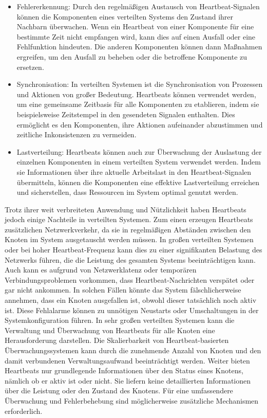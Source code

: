 \begin{itemize}
\item Fehlererkennung: Durch den regelmäßigen Austausch von Heartbeat-Signalen können die Komponenten eines verteilten Systems den Zustand ihrer Nachbarn überwachen. Wenn ein Heartbeat von einer Komponente für eine bestimmte Zeit nicht empfangen wird, kann dies auf einen Ausfall oder eine Fehlfunktion hindeuten. Die anderen Komponenten können dann Maßnahmen ergreifen, um den Ausfall zu beheben oder die betroffene Komponente zu ersetzen.
\item Synchronisation: In verteilten Systemen ist die Synchronisation von Prozessen und Aktionen von großer Bedeutung. Heartbeats können verwendet werden, um eine gemeinsame Zeitbasis für alle Komponenten zu etablieren, indem sie beispielsweise Zeitstempel in den gesendeten Signalen enthalten. Dies ermöglicht es den Komponenten, ihre Aktionen aufeinander abzustimmen und zeitliche Inkonsistenzen zu vermeiden.
\item Lastverteilung: Heartbeats können auch zur Überwachung der Auslastung der einzelnen Komponenten in einem verteilten System verwendet werden. Indem sie Informationen über ihre aktuelle Arbeitslast in den Heartbeat-Signalen übermitteln, können die Komponenten eine effektive Lastverteilung erreichen und sicherstellen, dass Ressourcen im System optimal genutzt werden.
\end{itemize}
Trotz ihrer weit verbreiteten Anwendung und Nützlichkeit haben Heartbeats jedoch einige Nachteile in verteilten Systemen. Zum einen erzeugen Heartbeats zusätzlichen Netzwerkverkehr, da sie in regelmäßigen Abständen zwischen den Knoten im System ausgetauscht werden müssen. In großen verteilten Systemen oder bei hoher Heartbeat-Frequenz kann dies zu einer signifikanten Belastung des Netzwerks führen, die die Leistung des gesamten Systems beeinträchtigen kann. Auch kann es aufgrund von Netzwerklatenz oder temporären Verbindungsproblemen vorkommen, dass Heartbeat-Nachrichten verspätet oder gar nicht ankommen. In solchen Fällen könnte das System fälschlicherweise annehmen, dass ein Knoten ausgefallen ist, obwohl dieser tatsächlich noch aktiv ist. Diese Fehlalarme können zu unnötigen Neustarts oder Umschaltungen in der Systemkonfiguration führen.
In sehr großen verteilten Systemen kann die Verwaltung und Überwachung von Heartbeats für alle Knoten eine Herausforderung darstellen. Die Skalierbarkeit von Heartbeat-basierten Überwachungssystemen kann durch die zunehmende Anzahl von Knoten und den damit verbundenen Verwaltungsaufwand beeinträchtigt werden. Weiter bieten Heartbeats nur grundlegende Informationen über den Status eines Knotens, nämlich ob er aktiv ist oder nicht. Sie liefern keine detaillierten Informationen über die Leistung oder den Zustand des Knotens. Für eine umfassendere Überwachung und Fehlerbehebung sind möglicherweise zusätzliche Mechanismen erforderlich.
